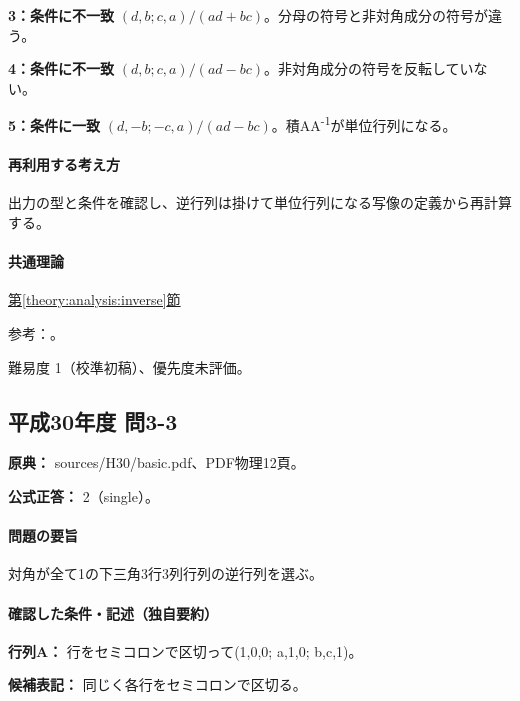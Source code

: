 \noindent\textbf{3：条件に不一致} \((d,b;c,a)/(ad+bc)\)。分母の符号と非対角成分の符号が違う。\par

\noindent\textbf{4：条件に不一致} \((d,b;c,a)/(ad-bc)\)。非対角成分の符号を反転していない。\par

\noindent\textbf{5：条件に一致} \((d,-b;-c,a)/(ad-bc)\)。積AA\textsuperscript{-1}が単位行列になる。\par

\paragraph{再利用する考え方} 出力の型と条件を確認し、逆行列は掛けて単位行列になる写像の定義から再計算する。

\paragraph{共通理論} \hyperref[theory:analysis:inverse]{第\ref*{theory:analysis:inverse}節}

\par 参考：\cite{mit_inverse2007}。

\par 難易度 1（校準初稿）、優先度未評価。

\subsection{平成30年度 問3-3}
\label{q:h30-reg-basic-3-3}

\noindent\textbf{原典：} sources/H30/basic.pdf、PDF物理12頁。

\textbf{公式正答：} 2（single）。

\paragraph{問題の要旨} 対角が全て1の下三角3行3列行列の逆行列を選ぶ。

\paragraph{確認した条件・記述（独自要約）}\mbox{}\par

\noindent\textbf{行列A：} 行をセミコロンで区切って(1,0,0; a,1,0; b,c,1)。\par

\noindent\textbf{候補表記：} 同じく各行をセミコロンで区切る。\par

